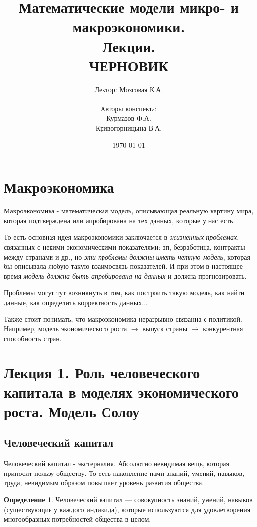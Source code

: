 \documentclass[reqno]{article}
\title{Математические модели микро- и макроэкономики.\\ Лекции.\\ ЧЕРНОВИК}
\author{Лектор: Мозговая К.А.\\ \\ Авторы конспекта: \\ Курмазов Ф.А.\\ Кривогорницына В.А.}
\date{\today}
\theoremstyle{definition}
\theoremstyle{definition}
\theoremstyle{definition}
\theoremstyle{definition}
\theoremstyle{definition}
\theoremstyle{definition}
\theoremstyle{definition}
\newtheorem*{defi}{Определение}
\theoremstyle{definition}
\theoremstyle{definition}
\begin{document}
	\setlength{\parindent}{0pt}
	\setlength{\parskip}{0.3em}

	\maketitle

	\tableofcontents
	\newpage

	\section*{Макроэкономика}
		Макроэкономика - математическая модель, описывающая реальную картину мира, которая подтверждена или апробирована на тех данных, которые у нас есть.
		
		То есть основная идея макроэкономики заключается в \emph{жизненных проблемах}, связанных с некими экономическими показателями: зп, безработица, контракты между странами и др., но \emph{эти проблемы должны иметь четкую модель}, которая бы описывала любую такую взаимосвязь показателей. И при этом в настоящее время \emph{модель должна быть апробирована на данных} и должна прогнозировать. \medskip
		
		Проблемы могут тут возникнуть в том, как построить такую модель, как найти данные, как определить корректность данных... 
		
		Также стоит понимать, что макроэкономика неразрывно связанна с политикой. Например, модель \hyperref[sec:1.2]{экономического роста} $\rightarrow$ выпуск страны $\rightarrow$ конкурентная способность стран.
		\newpage
	
	\section{Лекция 1. Роль человеческого капитала в моделях экономического роста. Модель Солоу}
		\subsection{Человеческий капитал}
			Человеческий капитал - экстерналия. Абсолютно невидимая вещь, которая приносит пользу обществу. То есть накопление нами знаний, умений, навыков, труда, невидимым образом повышает уровень развития общества.
			
			\begin{defi}
				Человеческий капитал — совокупность знаний, умений, навыков (существующие у каждого индивида), которые используются для удовлетворения многообразных потребностей общества в целом.
			\end{defi}
			
\end{document}

